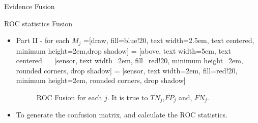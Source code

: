 \documentclass[10pt,professionalfonts]{beamer}
\begin{document}
\begin{frame}[fragile]{Evidence Fusion}
\begin{alertblock}{ROC statistics Fusion}
\begin{itemize}
\item Part II - for each $M_j$
=[draw, fill=blue!20, text width=2.5em, 
    text centered, minimum height=2em,drop shadow]
 = [above, text width=5em, text centered]
 = [sensor, text width=2em, fill=red!20, 
    minimum height=2em, rounded corners, drop shadow]
 = [sensor, text width=2em, fill=red!20, 
    minimum height=2em, rounded corners, drop shadow]
\begin{figure}[hbt]
\caption{ROC Fusion for each $j$. It is true to $\overline{TN}_j$,$\overline{FP}_j$ and, $\overline{FN}_j$. }
\label{fig9}
\end{figure}
\item To generate the confusion matrix, and calculate the ROC statistics.
\end{itemize}
\end{alertblock}
\end{frame}
\end{document}
